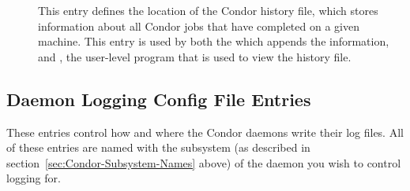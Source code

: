 \begin{description}
\item[] \label{param:History} This entry defines the
  location of the Condor history file, which stores information about
  all Condor jobs that have completed on a given machine.  This entry
  is used by both the  which appends the information,
  and , the user-level program that is used to view
  the history file.

\end{description}


\subsection{Daemon Logging Config File Entries}
\label{sec:Daemon-Logging-Config-File-Entries}

These entries control how and where the Condor daemons write their log
files.  All of these entries are named with the subsystem (as
described in section~\ref{sec:Condor-Subsystem-Names} above) of the daemon
you wish to control logging for.


